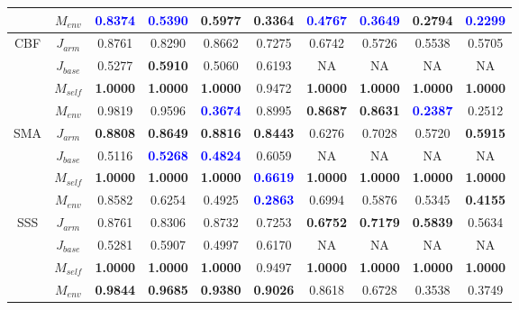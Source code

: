 \begin{table*}[ht]
{\begin{tabular}{cc|cccccccc}
                     & $M_{env}$  &  \textcolor{blue}{\textbf{0.8374}} &  \textcolor{blue}{\textbf{0.5390}} & 0.5977 & 0.3364 &  \textcolor{blue}{\textbf{0.4767}} &  \textcolor{blue}{\textbf{0.3649}} & 0.2794 &  \textcolor{blue}{\textbf{0.2299}} \\
\midrule
\multirow{4}{*}{CBF} & $J_{arm}$  & 0.8761 & 0.8290 & 0.8662 & 0.7275 & 0.6742 & 0.5726 & 0.5538 & 0.5705 \\
                     & $J_{base}$ & 0.5277 & \textbf{0.5910} & 0.5060 & 0.6193 & NA     & NA     & NA     & NA \\
                     & $M_{self}$ & \textbf{1.0000} & \textbf{1.0000} & \textbf{1.0000} & 0.9472 & \textbf{1.0000} & \textbf{1.0000} & \textbf{1.0000} & \textbf{1.0000} \\
                     & $M_{env}$  & 0.9819 & 0.9596 &  \textcolor{blue}{\textbf{0.3674}} & 0.8995 & \textbf{0.8687} & \textbf{0.8631} &  \textcolor{blue}{\textbf{0.2387}} & 0.2512 \\
\midrule
\multirow{4}{*}{SMA} & $J_{arm}$  & \textbf{0.8808} &  \textbf{0.8649} & \textbf{0.8816} & \textbf{0.8443} & 0.6276 & 0.7028 & 0.5720 & \textbf{0.5915} \\
                     & $J_{base}$ & 0.5116 &  \textcolor{blue}{\textbf{0.5268}} &  \textcolor{blue}{\textbf{0.4824}} & 0.6059 & NA     & NA     & NA     & NA \\
                     & $M_{self}$ & \textbf{1.0000} & \textbf{1.0000} & \textbf{1.0000} &  \textcolor{blue}{\textbf{0.6619}} & \textbf{1.0000} & \textbf{1.0000} & \textbf{1.0000} & \textbf{1.0000} \\
                     & $M_{env}$  & 0.8582 & 0.6254 & 0.4925 &  \textcolor{blue}{\textbf{0.2863}} & 0.6994 & 0.5876 & 0.5345 & \textbf{0.4155} \\
\midrule
\multirow{4}{*}{SSS} & $J_{arm}$  & 0.8761 & 0.8306 & 0.8732 & 0.7253 & \textbf{0.6752} & \textbf{0.7179} & \textbf{0.5839} & 0.5634 \\
                     & $J_{base}$ & 0.5281 & 0.5907 & 0.4997 & 0.6170 & NA     & NA     & NA     & NA \\
                     & $M_{self}$ & \textbf{1.0000} & \textbf{1.0000} & \textbf{1.0000} & 0.9497 & \textbf{1.0000} & \textbf{1.0000} & \textbf{1.0000} & \textbf{1.0000} \\
                     & $M_{env}$  & \textbf{0.9844} & \textbf{0.9685} & \textbf{0.9380} & \textbf{0.9026} & 0.8618 & 0.6728 & 0.3538 & 0.3749 \\
\bottomrule
\end{tabular}
} 
\end{table*}
